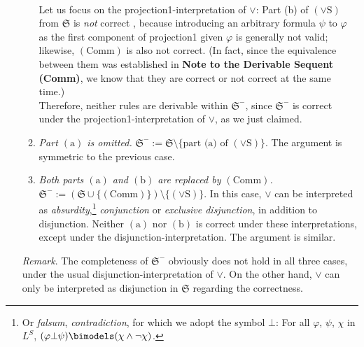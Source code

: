 \begin{enumerate}[1.]
\begin{enumerate}[(1)]
\\
Let us focus on the projection1-interpretation of $\lor$: Part (b) of $(\lor\mathrm{S})$ from $\mathfrak{S}$ is \emph{not} correct , because introducing an arbitrary formula $\psi$ to $\varphi$ as the first component of projection1 given $\varphi$ is generally not valid; likewise, $(\mathrm{Comm})$ is also not correct. (In fact, since the equivalence between them was established in \textbf{Note to the Derivable Sequent (Comm)}, we know that they are correct or not correct at the same time.)\newline
\\
Therefore, neither rules are derivable within $\mathfrak{S}^-$, since $\mathfrak{S}^-$ is correct under the projection1-interpretation of $\lor$, as we just claimed.
\item \emph{Part $(\mathrm{a})$ is omitted.} \begin{math}\mathfrak{S}^- := \mathfrak{S} \setminus \{\mbox{part (a) of $(\lor\mathrm{S})$}\}\end{math}. The argument is symmetric to the previous case.
\item \emph{Both parts $(\mathrm{a})$ and $(\mathrm{b})$ are replaced by $(\mathrm{Comm})$.} \begin{math}\mathfrak{S}^- := (\mathfrak{S} \cup \{(\mathrm{Comm})\}) \setminus \{(\lor\mathrm{S})\}\end{math}. In this case, $\lor$ can be interpreted as \emph{absurdity},\footnote{Or \emph{falsum}, \emph{contradiction}, for which we adopt the symbol $\bot$: For all $\varphi$, $\psi$, $\chi$ in $L^S$, $(\varphi \bot \psi) \bimodels (\chi \land \neg \chi)$.} \emph{conjunction} or \emph{exclusive disjunction}, in addition to disjunction. Neither $(\mathrm{a})$ nor $(\mathrm{b})$ is correct under these interpretations, except under the disjunction-interpretation. The argument is similar.
\end{enumerate}
\emph{Remark}. The completeness of $\mathfrak{S}^-$ obviously does not hold in all three cases, under the usual disjunction-interpretation of $\lor$. On the other hand, $\lor$ can only be interpreted as disjunction in $\mathfrak{S}$ regarding the correctness.
%

\end{enumerate}
